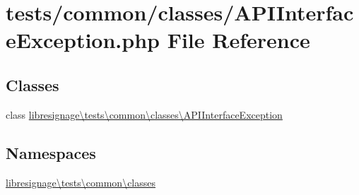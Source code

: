 \hypertarget{APIInterfaceException_8php}{}\section{tests/common/classes/\+A\+P\+I\+Interface\+Exception.php File Reference}
\label{APIInterfaceException_8php}
\subsection*{Classes}
\begin{DoxyCompactItemize}
\item 
class \hyperlink{classlibresignage_1_1tests_1_1common_1_1classes_1_1APIInterfaceException}{libresignage\textbackslash{}tests\textbackslash{}common\textbackslash{}classes\textbackslash{}\+A\+P\+I\+Interface\+Exception}
\end{DoxyCompactItemize}
\subsection*{Namespaces}
\begin{DoxyCompactItemize}
\item 
 \hyperlink{namespacelibresignage_1_1tests_1_1common_1_1classes}{libresignage\textbackslash{}tests\textbackslash{}common\textbackslash{}classes}
\end{DoxyCompactItemize}
